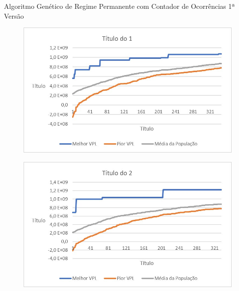 \documentclass[12pt,a4paper]{report}
\begin{document}
\appendix

\chapter{}

Algoritmo Genético de Regime Permanente com Contador de Ocorrências 1ª Versão

\begin{figure}[H]
\centering

\includegraphics[scale=1]{AGRPCO1/1}

\end{figure}

\begin{figure}[H]
\centering

\includegraphics[scale=1]{AGRPCO1/2}

\end{figure}
\end{document}
